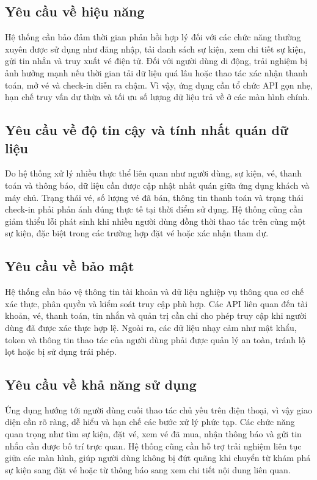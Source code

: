 \documentclass[../DoAn.tex]{subfiles}
\begin{document}
\subsection{Yêu cầu về hiệu năng}
Hệ thống cần bảo đảm thời gian phản hồi hợp lý đối với các chức năng thường xuyên được sử dụng như đăng nhập, tải danh sách sự kiện, xem chi tiết sự kiện, gửi tin nhắn và truy xuất vé điện tử. Đối với người dùng di động, trải nghiệm bị ảnh hưởng mạnh nếu thời gian tải dữ liệu quá lâu hoặc thao tác xác nhận thanh toán, mở vé và check-in diễn ra chậm. Vì vậy, ứng dụng cần tổ chức API gọn nhẹ, hạn chế truy vấn dư thừa và tối ưu số lượng dữ liệu trả về ở các màn hình chính.

\subsection{Yêu cầu về độ tin cậy và tính nhất quán dữ liệu}
Do hệ thống xử lý nhiều thực thể liên quan như người dùng, sự kiện, vé, thanh toán và thông báo, dữ liệu cần được cập nhật nhất quán giữa ứng dụng khách và máy chủ. Trạng thái vé, số lượng vé đã bán, thông tin thanh toán và trạng thái check-in phải phản ánh đúng thực tế tại thời điểm sử dụng. Hệ thống cũng cần giảm thiểu lỗi phát sinh khi nhiều người dùng đồng thời thao tác trên cùng một sự kiện, đặc biệt trong các trường hợp đặt vé hoặc xác nhận tham dự.

\subsection{Yêu cầu về bảo mật}
Hệ thống cần bảo vệ thông tin tài khoản và dữ liệu nghiệp vụ thông qua cơ chế xác thực, phân quyền và kiểm soát truy cập phù hợp. Các API liên quan đến tài khoản, vé, thanh toán, tin nhắn và quản trị cần chỉ cho phép truy cập khi người dùng đã được xác thực hợp lệ. Ngoài ra, các dữ liệu nhạy cảm như mật khẩu, token và thông tin thao tác của người dùng phải được quản lý an toàn, tránh lộ lọt hoặc bị sử dụng trái phép.

\subsection{Yêu cầu về khả năng sử dụng}
Ứng dụng hướng tới người dùng cuối thao tác chủ yếu trên điện thoại, vì vậy giao diện cần rõ ràng, dễ hiểu và hạn chế các bước xử lý phức tạp. Các chức năng quan trọng như tìm sự kiện, đặt vé, xem vé đã mua, nhận thông báo và gửi tin nhắn cần được bố trí trực quan. Hệ thống cũng cần hỗ trợ trải nghiệm liên tục giữa các màn hình, giúp người dùng không bị đứt quãng khi chuyển từ khám phá sự kiện sang đặt vé hoặc từ thông báo sang xem chi tiết nội dung liên quan.
\end{document}
